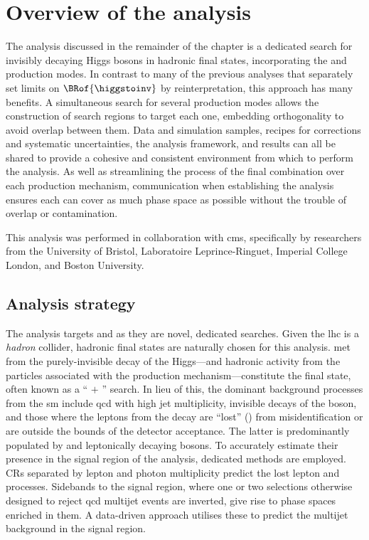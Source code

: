 \section{Overview of the analysis}
\label{sec:htoinv_analysis_overview}

The analysis discussed in the remainder of the chapter is a dedicated search for invisibly decaying Higgs bosons in hadronic final states, incorporating the \ttH and \VH production modes. In contrast to many of the previous analyses that separately set limits on $\BRof{\higgstoinv}$ by reinterpretation, this approach has many benefits. A simultaneous search for several production modes allows the construction of search regions to target each one, embedding orthogonality to avoid overlap between them. Data and simulation samples, recipes for corrections and systematic uncertainties, the analysis framework, and results can all be shared to provide a cohesive and consistent environment from which to perform the analysis. As well as streamlining the process of the final combination over each production mechanism, communication when establishing the analysis ensures each can cover as much phase space as possible without the trouble of overlap or contamination.

This analysis was performed in collaboration with \acrshort{cms}, specifically by researchers from the University of Bristol, Laboratoire Leprince-Ringuet, Imperial College London, and Boston University.




\subsection{Analysis strategy}
\label{subsec:htoinv_analysis_strategy}

The analysis targets \ttH and \VH as they are novel, dedicated searches. Given the \acrshort{lhc} is a \emph{hadron} collider, hadronic final states are naturally chosen for this analysis. \Gls{met} from the purely-invisible decay of the Higgs---and hadronic activity from the particles associated with the production mechanism---constitute the final state, often known as a `` $+$ \ptvecmiss'' search. In lieu of this, the dominant background processes from the \acrlong{sm} include \acrshort{qcd} with high \gls{jet} multiplicity, invisible decays of the \PZ boson, and those where the leptons from the decay are ``lost'' (\lostlepton) from misidentification or are outside the bounds of the detector acceptance. The latter is predominantly populated by \ttbar and leptonically decaying \PW bosons. To accurately estimate their presence in the signal region of the analysis, dedicated methods are employed. \Glspl{CR} separated by lepton and photon multiplicity predict the lost lepton and \ztonunu processes. Sidebands to the signal region, where one or two selections otherwise designed to reject \acrshort{qcd} multijet events are inverted, give rise to phase spaces enriched in them. A data-driven approach utilises these to predict the multijet background in the signal region.

